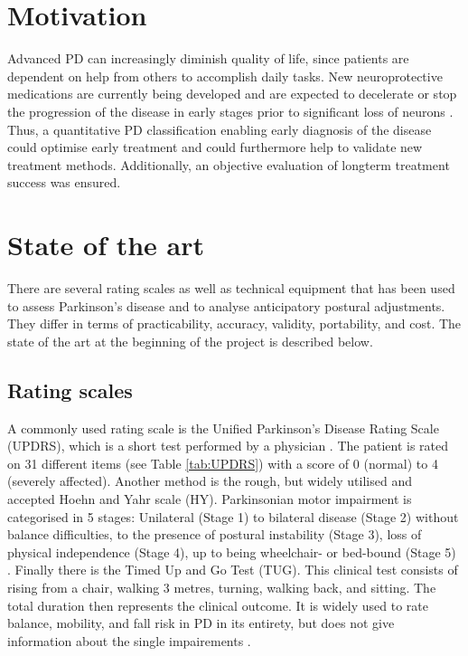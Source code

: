 \section{Motivation}

Advanced PD can increasingly diminish quality of life, since patients are dependent on help from others to accomplish daily tasks. New neuroprotective medications are currently being developed and are expected to decelerate or stop the progression of the disease in early stages prior to significant loss of neurons \cite{botzel_motivation_2014}\cite{mancini_isway:_2012}. Thus, a quantitative PD classification enabling early diagnosis of the disease could optimise early treatment and could furthermore help to validate new treatment methods. Additionally, an objective evaluation of longterm treatment success was ensured.


\section{State of the art}

There are several rating scales as well as technical equipment that has been used to assess Parkinson's disease and to analyse anticipatory postural adjustments.  They differ in terms of practicability, accuracy, validity, portability, and cost. The state of the art at the beginning of the project is described below.

\subsection{Rating scales}

A commonly used rating scale is the Unified Parkinson’s Disease Rating Scale (UPDRS), which is a short test performed by a physician \cite{klerk_long-term_2009}. The patient is rated on 31 different items (see Table \ref{tab:UPDRS}) with a score of 0 (normal) to 4 (severely affected). Another method is the rough, but widely utilised and accepted Hoehn and Yahr scale (HY). Parkinsonian motor impairment is categorised in 5 stages: Unilateral (Stage 1) to bilateral disease (Stage 2) without balance difficulties, to the presence of postural instability (Stage 3), loss of physical independence (Stage 4), up to being wheelchair- or bed-bound (Stage 5) \cite{goetz_movement_2004}. Finally there is the Timed Up and Go Test (TUG). This clinical test consists of rising from a chair, walking 3 metres, turning, walking back, and sitting. The total duration then represents the clinical outcome. It is widely used to rate balance, mobility, and fall risk in PD in its entirety, but does not give information about the single impairements \cite{palmerini_quantification_2013}.

